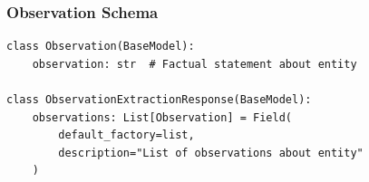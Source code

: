 \subsubsection{Observation Schema}

\begin{tcolorbox}[
    colback=teal!5!white,
    colframe=teal!60!black,
    title=Observation Extraction Schema (Pydantic),
    fonttitle=\bfseries,
    coltitle=white,
    colbacktitle=teal!60!black,
    boxrule=1.0pt,
    arc=1.5mm,
    enhanced,
    breakable
]
\small
\begin{verbatim}
class Observation(BaseModel):
    observation: str  # Factual statement about entity

class ObservationExtractionResponse(BaseModel):
    observations: List[Observation] = Field(
        default_factory=list,
        description="List of observations about entity"
    )
\end{verbatim}
\end{tcolorbox}
